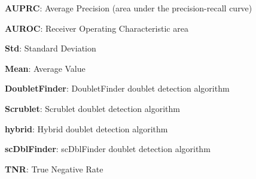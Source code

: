 \documentclass[11pt]{article}
\begin{document}
\begin{table}[h]
\caption{\protect\hyperlink{file-table-0-pkl}{Descriptive statistics of AUPRC, AUROC and TNR metrics stratified by doublet detection algorithm}}
\label{table:descriptive_stats}
\begin{threeparttable}
\renewcommand{\TPTminimum}{\linewidth}
\begin{tablenotes}
\footnotesize
\item \textbf{AUPRC}: Average Precision (area under the precision-recall curve)
\item \textbf{AUROC}: Receiver Operating Characteristic area
\item \textbf{Std}: Standard Deviation
\item \textbf{Mean}: Average Value
\item \textbf{DoubletFinder}: DoubletFinder doublet detection algorithm
\item \textbf{Scrublet}: Scrublet doublet detection algorithm
\item \textbf{hybrid}: Hybrid doublet detection algorithm
\item \textbf{scDblFinder}: scDblFinder doublet detection algorithm
\item \textbf{TNR}: True Negative Rate
\end{tablenotes}
\end{threeparttable}
\end{table}
\end{document}
